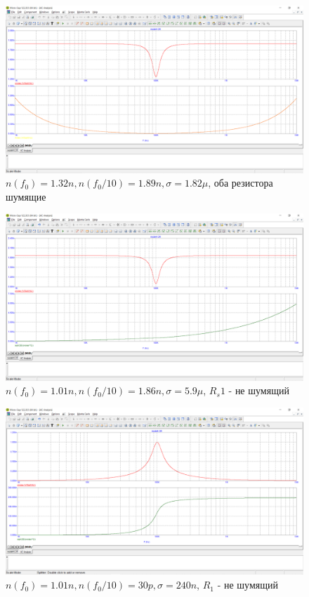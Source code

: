 \documentclass[a4paper, 12pt]{article}%
\begin{document}
\begin{figure}[h!]
    \centering
    \includegraphics[scale = 0.4 \textwidth]{images/mod4_1_2_1.png}
    \caption{$n(f_0) = 1.32n, n(f_0/10) = 1.89n, \sigma = 1.82\mu$, оба резистора шумящие}
    \label{fig:m4121}
\end{figure}

\begin{figure}[h!]
    \centering
    \includegraphics[scale = 0.4 \textwidth]{images/mod4_1_2_2.png}
    \caption{$n(f_0) = 1.01n, n(f_0/10) = 1.86n, \sigma = 5.9 \mu$, $R_s1$ - не шумящий}
    \label{fig:m4122}
\end{figure}

\begin{figure}[h!]
    \centering
    \includegraphics[scale = 0.4 \textwidth]{images/mod4_1_2_3.png}
    \caption{$n(f_0) = 1.01n, n(f_0/10) = 30p, \sigma = 240n$, $R_1$ - не шумящий}
    \label{fig:m4122}
\end{figure}
\end{document}
